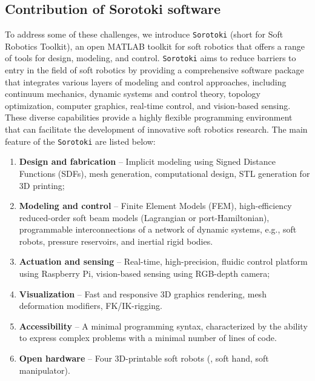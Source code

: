 \subsection{Contribution of Sorotoki software}
To address some of these challenges, we introduce \texttt{Sorotoki} (short for Soft Robotics Toolkit), an open MATLAB\textsuperscript{\scriptsize\textregistered} toolkit for soft robotics that offers a range of tools for design, modeling, and control. \texttt{Sorotoki} aims to reduce barriers to entry in the field of soft robotics by providing a comprehensive software package that integrates various layers of modeling and control approaches, including continuum mechanics, dynamic systems and control theory, topology optimization, computer graphics, real-time control, and vision-based sensing. These diverse capabilities provide a highly flexible programming environment that can facilitate the development of innovative soft robotics research. The main feature of the \texttt{Sorotoki} are listed below:
%
\begin{enumerate}
    \setlength\itemsep{-0.1em}
    \item \textbf{Design and fabrication} -- Implicit modeling using Signed Distance Functions (SDFs), mesh generation, computational design, STL generation for 3D printing;
    \item \textbf{Modeling and control} -- Finite Element Models (FEM), high-efficiency reduced-order soft beam models (Lagrangian or port-Hamiltonian), programmable interconnections of a network of dynamic systems, e.g., soft robots, pressure reservoirs, and inertial rigid bodies.
    \item \textbf{Actuation and sensing} -- Real-time, high-precision, fluidic control platform using Raspberry Pi, vision-based sensing using RGB-depth camera;
    \item \textbf{Visualization} -- Fast and responsive 3D graphics rendering, mesh deformation modifiers, FK/IK-rigging.
    \item \textbf{Accessibility} -- A minimal programming syntax, characterized by the ability to express complex problems with a minimal number of lines of code.
    \item \textbf{Open hardware} -- Four 3D-printable soft robots (\eg, soft hand, soft manipulator).
\end{enumerate}
%

